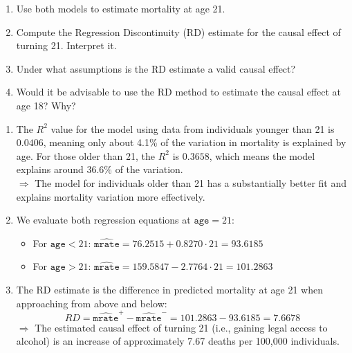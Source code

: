 \documentclass[11pt]{exam}
\begin{document}
\begin{questions}
\begin{enumerate}[label=(\alph*)]
    \item Use both models to estimate mortality at age 21.
    
    \item Compute the Regression Discontinuity (RD) estimate for the causal effect of turning 21. Interpret it.
    
    \item Under what assumptions is the RD estimate a valid causal effect?
    
    \item Would it be advisable to use the RD method to estimate the causal effect at age 18? Why?
\end{enumerate}

\begin{solution}

\begin{enumerate}[label=(\alph*)]
    \item The $R^2$ value for the model using data from individuals younger than 21 is $0.0406$, meaning only about 4.1\% of the variation in mortality is explained by age. For those older than 21, the $R^2$ is $0.3658$, which means the model explains around 36.6\% of the variation.  
    \\
    $\Rightarrow$ The model for individuals older than 21 has a substantially better fit and explains mortality variation more effectively.

    \item We evaluate both regression equations at $\texttt{age} = 21$:

    \begin{itemize}
        \item For $\texttt{age} < 21$:  
        $\widehat{\texttt{mrate}} = 76.2515 + 0.8270 \cdot 21 = 93.6185$
        
        \item For $\texttt{age} > 21$:  
        $\widehat{\texttt{mrate}} = 159.5847 - 2.7764 \cdot 21 = 101.2863$
    \end{itemize}
    
    \item The RD estimate is the difference in predicted mortality at age 21 when approaching from above and below:
    $$
    RD = \widehat{\texttt{mrate}}^{+} - \widehat{\texttt{mrate}}^{-} = 101.2863 - 93.6185 = \boxed{7.6678}
    $$
    $\Rightarrow$ The estimated causal effect of turning 21 (i.e., gaining legal access to alcohol) is an increase of approximately 7.67 deaths per 100,000 individuals.


\end{enumerate}
\end{solution}
\end{questions}
\end{document}
